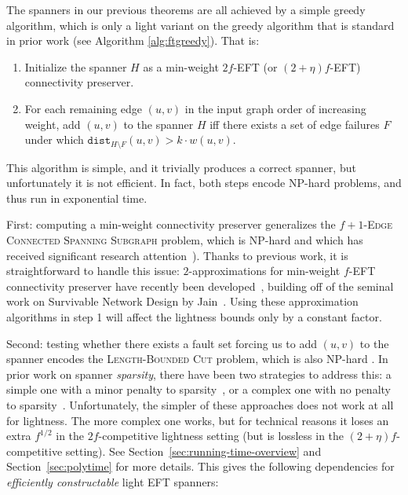 \documentclass{article}
\newif\ifshort
\theoremstyle{plain}
\theoremstyle{definition}
\newcommand{\dist}{\texttt{dist}}
\begin{document}
The spanners in our previous theorems are all achieved by a simple greedy algorithm, which is only a light variant on the greedy algorithm that is standard in prior work \cite{BDPV18, BP19} (see Algorithm \ref{alg:ftgreedy}).
That is:
\begin{enumerate}
\item Initialize the spanner $H$ as a min-weight $2f$-EFT (or $(2+\eta)f$-EFT) connectivity preserver.
\item For each remaining edge $(u, v)$ in the input graph order of increasing weight, add $(u, v)$ to the spanner $H$ iff there exists a set of edge failures $F$ under which $\dist_{H \setminus F}(u, v) > k \cdot w(u, v)$.
\end{enumerate}

This algorithm is simple, and it trivially produces a correct spanner, but unfortunately it is not efficient.
In fact, both steps encode NP-hard problems, and thus run in exponential time.

First: computing a min-weight connectivity preserver generalizes the \textsc{$f+1$-Edge Connected Spanning Subgraph} problem, which is NP-hard and which has received significant research attention~\cite{CT00,GGTW09,GG12}).
Thanks to previous work, it is straightforward to handle this issue: $2$-approximations for min-weight $f$-EFT connectivity preserver have recently been developed~\cite{DKK22,DKKN23}, building off of the seminal work on Survivable Network Design by Jain~\cite{Jain}.
Using these approximation algorithms in step 1 will affect the lightness bounds only by a constant factor. 


Second: testing whether there exists a fault set forcing us to add $(u, v)$ to the spanner encodes the \textsc{Length-Bounded Cut} problem, which is also NP-hard \cite{BEHKKPSS10}.
In prior work on spanner \emph{sparsity}, there have been two strategies to address this: a simple one with a minor penalty to sparsity~\cite{DR20}, or a complex one with no penalty to sparsity~\cite{BDR21}.  Unfortunately, the simpler of these approaches does not work at all for lightness.
The more complex one works, but for technical reasons it loses an extra $f^{1/2}$ in the $2f$-competitive lightness setting (but is lossless in the $(2+\eta)f$-competitive setting).
See Section~\ref{sec:running-time-overview} and \ifshort Appendix~\ref{app:polytime} \else Section~\ref{sec:polytime} \fi for more details.
This gives the following dependencies for \emph{efficiently constructable} light EFT spanners:
\end{document}
